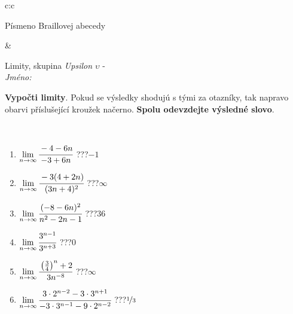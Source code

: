 \documentclass[10pt]{report}
\begin{document}
\begin{tabular}{c:c}
\begin{minipage}[c][104.5mm][t]{0.5\linewidth}
\begin{center}
\begin{minipage}{0.20\linewidth}
\begin{center}
{\small Písmeno Braillovej abecedy}
\end{center}
\end{minipage}
\end{center}
\end{minipage}
&
\begin{minipage}[c][104.5mm][t]{0.5\linewidth}
\begin{center}
\vspace{7mm}
{\huge Limity, skupina \textit{Upsilon $\upsilon$} -}\\[5mm]
\textit{Jméno:}\phantom{xxxxxxxxxxxxxxxxxxxxxxxxxxxxxxxxxxxxxxxxxxxxxxxxxxxxxxxxxxxxxxxxx}\\[5mm]
\begin{minipage}{0.95\linewidth}
\begin{center}
\textbf{Vypočti limity}. Pokud se výsledky shodujú s tými za otazníky, tak napravo\\obarvi příslušející kroužek načerno. \textbf{Spolu odevzdejte výsledné slovo}.
\end{center}
\end{minipage}
\\[1mm]
\begin{minipage}{0.79\linewidth}
\begin{center}
\begin{varwidth}{\linewidth}
\begin{enumerate}
\normalsize
\item $\lim\limits_{n\to\infty}\cfrac{-4-6n}{-3+6n}$\quad \dotfill\; ???\;\dotfill \quad $-1$
\item $\lim\limits_{n\to\infty}\cfrac{-3(4+2n)}{(3n+4)^2}$\quad \dotfill\; ???\;\dotfill \quad $\infty$
\item $\lim\limits_{n\to\infty}\cfrac{(-8-6n)^2}{n^2-2n-1}$\quad \dotfill\; ???\;\dotfill \quad $36$
\item $\lim\limits_{n\to\infty}\cfrac{3^{n-1}}{3^{n+3}}$\quad \dotfill\; ???\;\dotfill \quad $0$
\item $\lim\limits_{n\to\infty}\cfrac{\left(\frac{3}{4}\right)^n +2}{3n^{-8}}$\quad \dotfill\; ???\;\dotfill \quad $\infty$
\item $\lim\limits_{n\to\infty}\cfrac{3\cdot 2^{n-2}-3\cdot 3^{n+1}}{-3\cdot 3^{n-1}-9\cdot 2^{n-2}}$\quad \dotfill\; ???\;\dotfill \quad $\nicefrac{1}{3}$
\end{enumerate}
\end{varwidth}
\end{center}
\end{minipage}
\begin{minipage}{0.20\linewidth}

\end{minipage}
\end{center}
\end{minipage}
\end{tabular}
\end{document}
